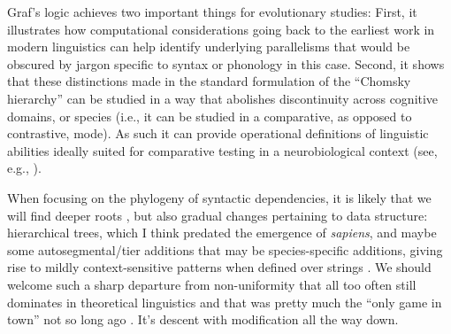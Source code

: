 Graf's logic achieves two important things for evolutionary studies: First, it illustrates how computational considerations going back to the earliest work in modern linguistics can help identify underlying parallelisms that would be obscured by jargon specific to syntax or phonology in this case. Second, it shows that these distinctions made in the standard formulation of the ``Chomsky hierarchy'' can be studied in a way that abolishes discontinuity across cognitive domains, or species (i.e., it can be studied in a comparative, as opposed to contrastive, mode). As such it can provide operational definitions of linguistic abilities ideally suited for comparative testing in a neurobiological context (see, e.g., \cite{wilson2017conserved}).

When focusing on the phylogeny of syntactic dependencies, it is likely that we will find deeper roots \citep{petkov2012pursuit,watson2020nonadjacent,girard2021chimpanzees}, but also gradual changes pertaining to data structure: hierarchical trees, which I think predated the emergence of \textit{sapiens}, and maybe some autosegmental/tier additions that may be species-specific additions, giving rise to mildly context-sensitive patterns when defined over strings \citep{malassis2020baboons}. We should welcome such a sharp departure from non-uniformity that all too often still dominates in theoretical linguistics and that was pretty much the ``only game in town'' not so long ago \citep{anderson2004doctor}. It's descent with modification all the way down.






